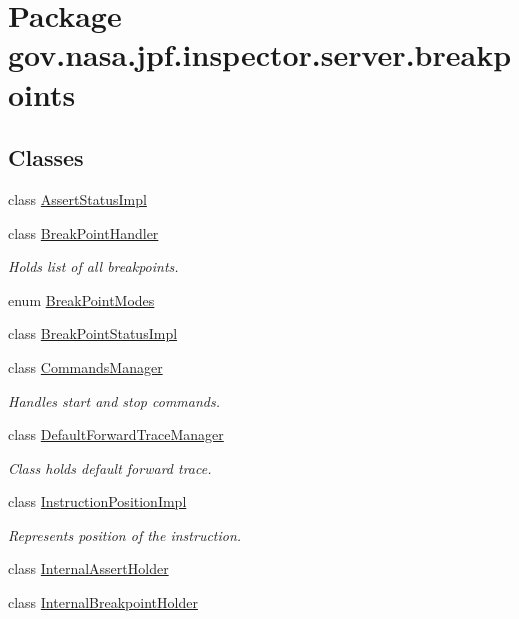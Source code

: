 \hypertarget{namespacegov_1_1nasa_1_1jpf_1_1inspector_1_1server_1_1breakpoints}{}\section{Package gov.\+nasa.\+jpf.\+inspector.\+server.\+breakpoints}
\label{namespacegov_1_1nasa_1_1jpf_1_1inspector_1_1server_1_1breakpoints}
\subsection*{Classes}
\begin{DoxyCompactItemize}
\item 
class \hyperlink{classgov_1_1nasa_1_1jpf_1_1inspector_1_1server_1_1breakpoints_1_1_assert_status_impl}{Assert\+Status\+Impl}
\item 
class \hyperlink{classgov_1_1nasa_1_1jpf_1_1inspector_1_1server_1_1breakpoints_1_1_break_point_handler}{Break\+Point\+Handler}
\begin{DoxyCompactList}\small\item\em Holds list of all breakpoints. \end{DoxyCompactList}\item 
enum \hyperlink{enumgov_1_1nasa_1_1jpf_1_1inspector_1_1server_1_1breakpoints_1_1_break_point_modes}{Break\+Point\+Modes}
\item 
class \hyperlink{classgov_1_1nasa_1_1jpf_1_1inspector_1_1server_1_1breakpoints_1_1_break_point_status_impl}{Break\+Point\+Status\+Impl}
\item 
class \hyperlink{classgov_1_1nasa_1_1jpf_1_1inspector_1_1server_1_1breakpoints_1_1_commands_manager}{Commands\+Manager}
\begin{DoxyCompactList}\small\item\em Handles start and stop commands. \end{DoxyCompactList}\item 
class \hyperlink{classgov_1_1nasa_1_1jpf_1_1inspector_1_1server_1_1breakpoints_1_1_default_forward_trace_manager}{Default\+Forward\+Trace\+Manager}
\begin{DoxyCompactList}\small\item\em Class holds default forward trace. \end{DoxyCompactList}\item 
class \hyperlink{classgov_1_1nasa_1_1jpf_1_1inspector_1_1server_1_1breakpoints_1_1_instruction_position_impl}{Instruction\+Position\+Impl}
\begin{DoxyCompactList}\small\item\em Represents position of the instruction. \end{DoxyCompactList}\item 
class \hyperlink{classgov_1_1nasa_1_1jpf_1_1inspector_1_1server_1_1breakpoints_1_1_internal_assert_holder}{Internal\+Assert\+Holder}
\item 
class \hyperlink{classgov_1_1nasa_1_1jpf_1_1inspector_1_1server_1_1breakpoints_1_1_internal_breakpoint_holder}{Internal\+Breakpoint\+Holder}
\end{DoxyCompactItemize}
